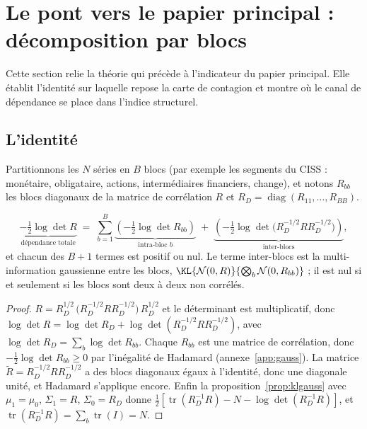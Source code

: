 
\section{Le pont vers le papier principal : décomposition par blocs}
\label{sec:blocks}

Cette section relie la théorie qui précède à l'indicateur du papier principal.
Elle établit l'identité sur laquelle repose la \og carte de contagion \fg{} et
montre où le canal de dépendance se place dans l'indice structurel.

\subsection{L'identité}

Partitionnons les $N$ séries en $B$ blocs (par exemple les segments du CISS :
monétaire, obligataire, actions, intermédiaires financiers, change), et notons
$R_{bb}$ les blocs diagonaux de la matrice de corrélation $R$ et
$R_D=\operatorname{diag}(R_{11},\dots,R_{BB})$.

\begin{proposition}
\label{prop:blocks}
\begin{equation}
\label{eq:blocks}
\underbrace{-\tfrac12\log\det R}_{\text{dépendance totale}}
\;=\;\sum_{b=1}^{B}\underbrace{\left(-\tfrac12\log\det R_{bb}\right)}_{\text{intra-bloc }b}
\;+\;\underbrace{\left(-\tfrac12\log\det\big(R_D^{-1/2}RR_D^{-1/2}\big)\right)}_{\text{inter-blocs}} ,
\end{equation}
et chacun des $B+1$ termes est positif ou nul. Le terme inter-blocs est la
multi-information gaussienne entre les blocs,
$\KL{\mathcal N(0,R)}{\bigotimes_b\mathcal N(0,R_{bb})}$ ; il est nul si et
seulement si les blocs sont deux à deux non corrélés.
\end{proposition}

\begin{proof}
$R=R_D^{1/2}\,\big(R_D^{-1/2}RR_D^{-1/2}\big)\,R_D^{1/2}$ et le déterminant est
multiplicatif, donc $\log\det R=\log\det R_D+\log\det(R_D^{-1/2}RR_D^{-1/2})$, avec
$\log\det R_D=\sum_b\log\det R_{bb}$. Chaque $R_{bb}$ est une matrice de
corrélation, donc $-\tfrac12\log\det R_{bb}\ge0$ par l'inégalité de Hadamard
(annexe~\ref{app:gauss}). La matrice $\tilde R=R_D^{-1/2}RR_D^{-1/2}$ a des blocs
diagonaux égaux à l'identité, donc une diagonale unité, et Hadamard s'applique
encore. Enfin la proposition~\ref{prop:klgauss} avec $\mu_1=\mu_0$,
$\Sigma_1=R$, $\Sigma_0=R_D$ donne
$\tfrac12[\operatorname{tr}(R_D^{-1}R)-N-\log\det(R_D^{-1}R)]$, et
$\operatorname{tr}(R_D^{-1}R)=\sum_b\operatorname{tr}(I)=N$.
\end{proof}

